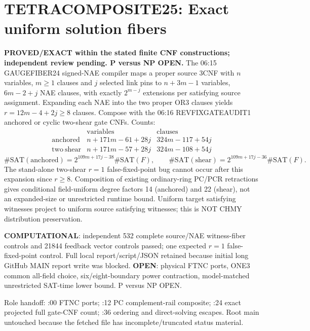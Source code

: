 \section*{TETRACOMPOSITE25: Exact uniform solution fibers}
\noindent \textbf{PROVED/EXACT within the stated finite CNF constructions; independent review pending. P versus NP OPEN.}
The 06:15 GAUGEFIBER24 signed-NAE compiler maps a proper source 3CNF with $n$ variables, $m\ge1$ clauses and $j$ selected link pins to $n+3m-1$ variables, $6m-2+j$ NAE clauses, with exactly $2^{m-j}$ extensions per satisfying source assignment. Expanding each NAE into the two proper OR3 clauses yields $r=12m-4+2j\ge8$ clauses. Compose with the 06:16 REVFIXGATEAUDIT1 anchored or cyclic two-shear gate CNFs. Counts:
\[
\begin{array}{c|cc}
&\mathrm{variables}&\mathrm{clauses}\\
\mathrm{anchored}&n+171m-61+28j&324m-117+54j\\
\mathrm{two\ shear}&n+171m-57+28j&324m-108+54j
\end{array}
\]
\[
\#\mathrm{SAT}(\mathrm{anchored})=2^{109m+17j-38}\#\mathrm{SAT}(F),\qquad
\#\mathrm{SAT}(\mathrm{shear})=2^{109m+17j-36}\#\mathrm{SAT}(F).
\]
The stand-alone two-shear $r=1$ false-fixed-point bug cannot occur after this expansion since $r\ge8$. Composition of existing ordinary-ring PC/PCR retractions gives conditional field-uniform degree factors 14 (anchored) and 22 (shear), not an expanded-size or unrestricted runtime bound. Uniform target satisfying witnesses project to uniform source satisfying witnesses; this is NOT CHMY distribution preservation.
\par\noindent \textbf{COMPUTATIONAL}: independent 532 complete source/NAE witness-fiber controls and 21844 feedback vector controls passed; one expected $r=1$ false-fixed-point control. Full local report/script/JSON retained because initial long GitHub MAIN report write was blocked. \textbf{OPEN}: physical FTNC ports, ONE3 common all-field choice, six/eight-boundary power contraction, model-matched unrestricted SAT-time lower bound. P versus NP OPEN.
\par\noindent Role handoff: :00 FTNC ports; :12 PC complement-rail composite; :24 exact projected full gate-CNF count; :36 ordering and direct-solving escapes. Root main untouched because the fetched file has incomplete/truncated status material.
